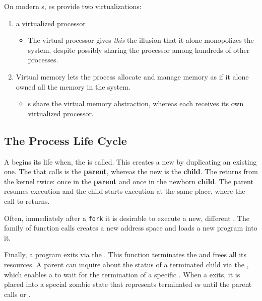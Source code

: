 On modern s, es provide two virtualizations:
\begin{enumerate}[noitemsep]
\item a virtualized processor
  \begin{itemize}[noitemsep]
  \item The virtual processor gives \emph{this}  the illusion that it alone monopolizes the system, despite possibly sharing the processor among hundreds of other processes.
\end{itemize}
\item Virtual memory lets the process allocate and manage memory as if it alone owned all the memory in the system.
  \begin{itemize}[noitemsep]
  \item {}s share the virtual memory abstraction, whereas each receives its own virtualized processor.
  \end{itemize}
\end{enumerate}

\subsection{The Process Life Cycle}\label{subsec:Process_Life_Cycle}
A  begins its life when, the   is called.
This creates a new  by duplicating an existing one.
The  that calls  is the \textbf{parent}, whereas the new  is the \textbf{child}.
The   returns from the kernel twice: once in the \textbf{parent} and once in the newborn \textbf{child}.
The parent resumes execution and the child starts execution at the same place, where the call to  returns.

Often, immediately after a \texttt{fork} it is desirable to execute a new, different .
The  family of function calls creates a new address space and loads a new program into it.

Finally, a program exits via the  .
This function terminates the  and frees all its resources.
A parent  can inquire about the status of a terminated child via the  , which enables a  to wait for the termination of a specific .
When a  exits, it is placed into a special zombie state that represents terminated es until the parent calls  or .

